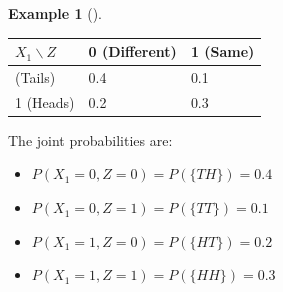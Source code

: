 \documentclass[
  letterpaper,
  DIV=11,
  numbers=noendperiod]{scrreport}
\providecommand{\tightlist}{%
  \setlength{\itemsep}{0pt}\setlength{\parskip}{0pt}}
\theoremstyle{definition}
\newtheorem{example}{Example}[chapter]
\theoremstyle{plain}
\theoremstyle{definition}
\theoremstyle{plain}
\theoremstyle{remark}
\begin{document}
\begin{tcolorbox}
\begin{example}[]
\begin{longtable}[]{@{}lll@{}}
\toprule\noalign{}
\(X_1 \backslash Z\) & 0 (Different) & 1 (Same) \\
\midrule\noalign{}
\endhead
\bottomrule\noalign{}
\endlastfoot
0 (Tails) & 0.4 & 0.1 \\
1 (Heads) & 0.2 & 0.3 \\
\end{longtable}

The joint probabilities are:

\begin{itemize}
\tightlist
\item
  \(P(X_1=0, Z=0) = P(\{TH\}) = 0.4\)
\item
  \(P(X_1=0, Z=1) = P(\{TT\}) = 0.1\)
\item
  \(P(X_1=1, Z=0) = P(\{HT\}) = 0.2\)
\item
  \(P(X_1=1, Z=1) = P(\{HH\}) = 0.3\)
\end{itemize}

\end{example}

\end{tcolorbox}
\end{document}
